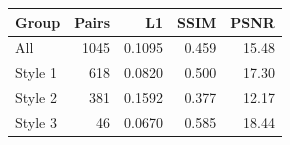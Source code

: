\begin{tabular}{lrrrr}
\toprule
Group & Pairs & L1 & SSIM & PSNR \\
\midrule
All & 1045 & 0.1095 & 0.459 & 15.48 \\
Style 1 & 618 & 0.0820 & 0.500 & 17.30 \\
Style 2 & 381 & 0.1592 & 0.377 & 12.17 \\
Style 3 & 46 & 0.0670 & 0.585 & 18.44 \\
\bottomrule
\end{tabular}
